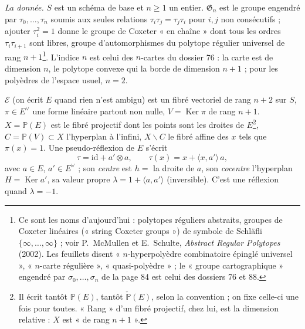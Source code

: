 \documentclass[11pt,a4paper]{article}
\begin{document}
\emph{La donnée.} $S$ est un schéma de base et $n \geqslant 1$ un entier.
$\mathfrak{G}_n$ est le groupe engendré par $\tau_0, \ldots, \tau_n$ soumis aux
seules relations $\tau_i\tau_j = \tau_j\tau_i$ pour $i, j$ non consécutifs ;
ajouter $\tau_i^2 = 1$ donne le groupe de Coxeter « en chaîne » dont tous les
ordres $\tau_i\tau_{i+1}$ sont libres, groupe d'automorphismes du polytope
régulier universel de rang $n+1$\footnote{Ce sont les noms d'aujourd'hui :
polytopes réguliers abstraits, groupes de Coxeter linéaires (« string Coxeter
groups ») de symbole de Schläfli $\{\infty, \ldots, \infty\}$ ; voir P.~McMullen
et E.~Schulte, \emph{Abstract Regular Polytopes} (2002). Les feuillets disent
« $n$-hyperpolyèdre combinatoire épinglé universel », « $n$-carte régulière »,
« quasi-polyèdre » ; le « groupe cartographique » engendré par $\sigma_0,
\ldots, \sigma_n$ de la page 84 est celui des dossiers 76 et 88.}. L'indice
$n$ est celui des $n$-cartes du dossier 76 : la carte est de dimension $n$, le
polytope convexe qui la borde de dimension $n+1$ ; pour les polyèdres de
l'espace usuel, $n = 2$.

$\mathcal{E}$ (on écrit $E$ quand rien n'est ambigu) est un fibré vectoriel de
rang $n+2$ sur $S$, $\pi \in E^\vee$ une forme linéaire partout non nulle,
$V = \operatorname{Ker} \pi$ de rang $n+1$. $X = \mathbb{P}(E)$ est le fibré
projectif dont les points sont les droites de $E$\footnote{Il écrit tantôt
$\mathbb{P}(E)$, tantôt $\check{\mathbb{P}}(E)$, selon la convention ; on fixe
celle-ci une fois pour toutes. « Rang » d'un fibré projectif, chez lui, est la
dimension relative : $X$ est « de rang $n+1$ ».}, $C = \mathbb{P}(V) \subset
X$ l'hyperplan à l'infini, $X \smallsetminus C$ le fibré affine des
$x$ tels que $\pi(x) = 1$. Une pseudo-réflexion de $E$ s'écrit
\[
\tau = \mathrm{id} + a' \otimes a, \qquad \tau(x) = x + \langle x, a' \rangle\, a ,
\]
avec $a \in E$, $a' \in E^\vee$ ; son \emph{centre} est $h = $ la droite de
$a$, son \emph{cocentre} l'hyperplan $H = \operatorname{Ker} a'$, sa valeur
propre $\lambda = 1 + \langle a, a' \rangle$ (inversible). C'est une réflexion
quand $\lambda = -1$.
\end{document}
